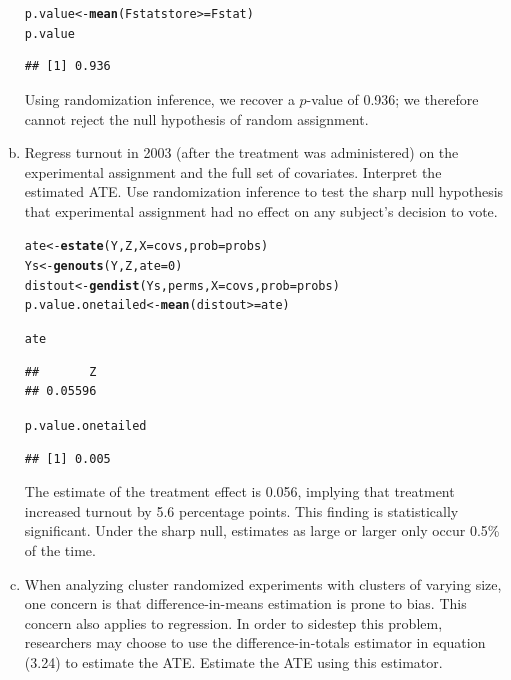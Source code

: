 \documentclass[11pt,notitlepage]{article}\usepackage[]{graphicx}\usepackage[]{color}
\makeatletter
\newcommand{\hlnum}[1]{\textcolor[rgb]{0.686,0.059,0.569}{#1}}%
\newcommand{\hlopt}[1]{\textcolor[rgb]{0,0,0}{#1}}%
\newcommand{\hlstd}[1]{\textcolor[rgb]{0.345,0.345,0.345}{#1}}%
\newcommand{\hlkwb}[1]{\textcolor[rgb]{0.69,0.353,0.396}{#1}}%
\newcommand{\hlkwc}[1]{\textcolor[rgb]{0.333,0.667,0.333}{#1}}%
\newcommand{\hlkwd}[1]{\textcolor[rgb]{0.737,0.353,0.396}{\textbf{#1}}}%
\newenvironment{kframe}{%
 \def\at@end@of@kframe{}%
 \ifinner\ifhmode%
  \def\at@end@of@kframe{\end{minipage}}%
  \begin{minipage}{\columnwidth}%
 \fi\fi%
 \def\FrameCommand##1{\hskip\@totalleftmargin \hskip-\fboxsep
 \colorbox{shadecolor}{##1}\hskip-\fboxsep
     \hskip-\linewidth \hskip-\@totalleftmargin \hskip\columnwidth}%
 \MakeFramed {\advance\hsize-\width
   \@totalleftmargin\z@ \linewidth\hsize
   \@setminipage}}%
 {\par\unskip\endMakeFramed%
 \at@end@of@kframe}
\newenvironment{knitrout}{}{} %
\makeatother
\begin{document}
\begin{enumerate}[a)]
\begin{knitrout}
\begin{kframe}
\begin{alltt}
\hlstd{p.value} \hlkwb{<-} \hlkwd{mean}\hlstd{(Fstatstore} \hlopt{>=} \hlstd{Fstat)}
\hlstd{p.value}
\end{alltt}
\begin{verbatim}
## [1] 0.936
\end{verbatim}
\end{kframe}
\end{knitrout}

Using randomization inference, we recover a $p$-value of 0.936; we therefore cannot reject the null hypothesis of random assignment.

\item Regress turnout in 2003 (after the treatment was administered) on the experimental assignment and the full set of covariates. Interpret the estimated ATE. Use randomization inference to test the sharp null hypothesis that experimental assignment had no effect on any subject's decision to vote.  

\begin{knitrout}
\color{fgcolor}\begin{kframe}
\begin{alltt}
\hlstd{ate} \hlkwb{<-} \hlkwd{estate}\hlstd{(Y,Z,}\hlkwc{X}\hlstd{=covs,}\hlkwc{prob}\hlstd{=probs)}
\hlstd{Ys} \hlkwb{<-} \hlkwd{genouts}\hlstd{(Y,Z,}\hlkwc{ate}\hlstd{=}\hlnum{0}\hlstd{)}
\hlstd{distout} \hlkwb{<-} \hlkwd{gendist}\hlstd{(Ys,perms,}\hlkwc{X}\hlstd{=covs,}\hlkwc{prob}\hlstd{=probs)}
\hlstd{p.value.onetailed} \hlkwb{<-} \hlkwd{mean}\hlstd{(distout} \hlopt{>=} \hlstd{ate)}

\hlstd{ate}
\end{alltt}
\begin{verbatim}
##       Z 
## 0.05596
\end{verbatim}
\begin{alltt}
\hlstd{p.value.onetailed}
\end{alltt}
\begin{verbatim}
## [1] 0.005
\end{verbatim}
\end{kframe}
\end{knitrout}

The estimate of the treatment effect is 0.056, implying that treatment increased turnout by 5.6 percentage points. This finding is statistically significant. Under the sharp null, estimates as large or larger only occur 0.5\% of the time.

\item When analyzing cluster randomized experiments with clusters of varying size, one concern is that difference-in-means estimation is prone to bias. This concern also applies to regression.  In order to sidestep this problem, researchers may choose to use the difference-in-totals estimator in equation (3.24) to estimate the ATE. Estimate the ATE using this estimator.


\end{enumerate}
\end{document}
